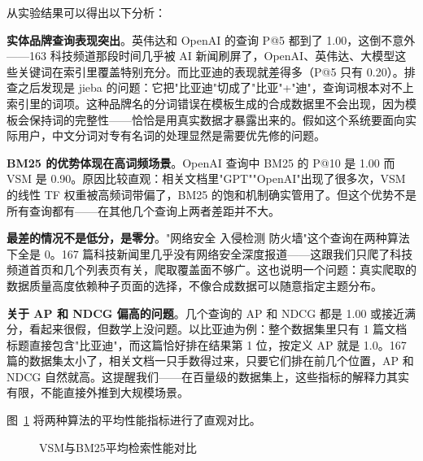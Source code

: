 \documentclass[12pt, a4paper]{ctexart}
\begin{document}
从实验结果可以得出以下分析：

\textbf{实体品牌查询表现突出}。英伟达和 OpenAI 的查询 P@5 都到了 1.00，这倒不意外——163 科技频道那段时间几乎被 AI 新闻刷屏了，OpenAI、英伟达、大模型这些关键词在索引里覆盖特别充分。而比亚迪的表现就差得多（P@5 只有 0.20）。排查之后发现是 jieba 的问题：它把"比亚迪"切成了"比亚"+"迪"，查询词根本对不上索引里的词项。这种品牌名的分词错误在模板生成的合成数据里不会出现，因为模板会保持词的完整性——恰恰是用真实数据才暴露出来的。假如这个系统要面向实际用户，中文分词对专有名词的处理显然是需要优先修的问题。

\textbf{BM25 的优势体现在高词频场景}。OpenAI 查询中 BM25 的 P@10 是 1.00 而 VSM 是 0.90。原因比较直观：相关文档里"GPT""OpenAI"出现了很多次，VSM 的线性 TF 权重被高频词带偏了，BM25 的饱和机制确实管用了。但这个优势不是所有查询都有——在其他几个查询上两者差距并不大。

\textbf{最差的情况不是低分，是零分}。"网络安全 入侵检测 防火墙"这个查询在两种算法下全是 0。167 篇科技新闻里几乎没有网络安全深度报道——这跟我们只爬了科技频道首页和几个列表页有关，爬取覆盖面不够广。这也说明一个问题：真实爬取的数据质量高度依赖种子页面的选择，不像合成数据可以随意指定主题分布。

\textbf{关于 AP 和 NDCG 偏高的问题}。几个查询的 AP 和 NDCG 都是 1.00 或接近满分，看起来很假，但数学上没问题。以比亚迪为例：整个数据集里只有 1 篇文档标题直接包含"比亚迪"，而这篇恰好排在结果第 1 位，按定义 AP 就是 1.0。167 篇的数据集太小了，相关文档一只手数得过来，只要它们排在前几个位置，AP 和 NDCG 自然就高。这提醒我们——在百量级的数据集上，这些指标的解释力其实有限，不能直接外推到大规模场景。

图~\ref{fig:vsm_bm25} 将两种算法的平均性能指标进行了直观对比。

\begin{figure}[H]
\centering
{}
\caption{VSM与BM25平均检索性能对比}
\label{fig:vsm_bm25}
\end{figure}
\end{document}
